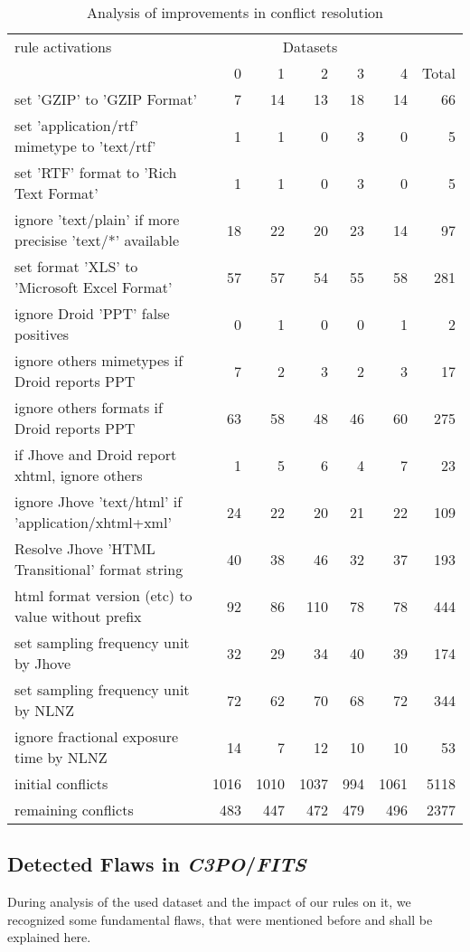 \documentclass[a4paper,12pt]{article}
\begin{document}
\begin{table}[H]
\begin{center}
\begin{tabular}[h]{l||r|r|r|r|r||r}
rule activations &  \multicolumn{5}{c}{Datasets} \\
        & 0 & 1 & 2 & 3 & 4 & Total \\
\hline
set 'GZIP' to 'GZIP Format' & 7 & 14 & 13 & 18 & 14 & 66\\
set 'application/rtf' mimetype to 'text/rtf' & 1 & 1 & 0 & 3 & 0 & 5\\
set 'RTF' format to 'Rich Text Format' & 1 & 1 & 0 & 3 & 0 & 5\\
ignore 'text/plain' if more precisise 'text/*' available & 18 & 22 & 20 & 23 & 14 & 97\\
set format 'XLS' to 'Microsoft Excel Format' & 57 & 57 & 54 & 55 & 58 & 281\\
ignore Droid 'PPT' false positives & 0 & 1 & 0 & 0 & 1 & 2\\
ignore others mimetypes if Droid reports PPT & 7 & 2 & 3 & 2 & 3 & 17\\
ignore others formats if Droid reports PPT & 63 & 58 & 48 & 46 & 60 & 275\\
if Jhove and Droid report xhtml, ignore others & 1 & 5 & 6 & 4 & 7 & 23\\
ignore Jhove 'text/html' if 'application/xhtml+xml' & 24 & 22 & 20 & 21 & 22 & 109\\
Resolve Jhove 'HTML Transitional' format string & 40 & 38 & 46 & 32 & 37 & 193\\
html format version (etc) to value without prefix & 92 & 86 & 110 & 78 & 78 & 444\\
set sampling frequency unit by Jhove & 32 & 29 & 34 & 40 & 39 & 174\\
set sampling frequency unit by NLNZ & 72 & 62 & 70 & 68 & 72 & 344\\
ignore fractional exposure time by NLNZ & 14 & 7 & 12 & 10 & 10 & 53\\
\hline
initial conflicts & 1016 & 1010	& 1037 & 994 &1061 & 5118 \\
\hline
remaining conflicts & 483 &	447	& 472 &	479	& 496 &	2377

\end{tabular}
\end{center}
\caption{Analysis of improvements in conflict resolution}
\label{tab:conflicts}
\end{table}

\subsection{Detected Flaws in \emph{C3PO}/\emph{FITS}}
During analysis of the used dataset and the impact of our rules on it, we recognized some fundamental flaws, that were mentioned before and shall be explained here.
\end{document}
